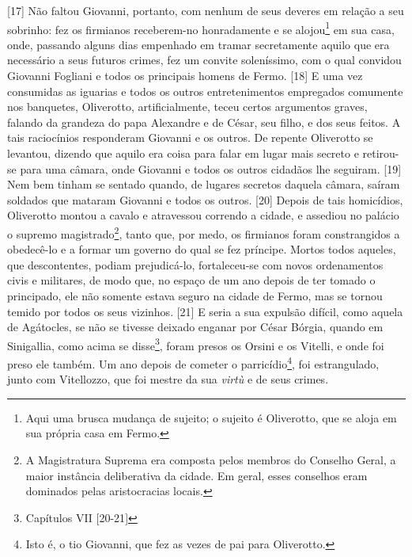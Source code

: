 {[}17{]} Não faltou Giovanni, portanto, com nenhum de seus deveres em
relação a seu sobrinho: fez os firmianos receberem-no honradamente e se
alojou\footnote{Aqui uma brusca mudança de sujeito; o sujeito é
  Oliverotto, que se aloja em sua própria casa em Fermo.} em sua casa,
onde, passando alguns dias empenhado em tramar secretamente aquilo que
era necessário a seus futuros crimes, fez um convite soleníssimo, com o
qual convidou Giovanni Fogliani e todos os principais homens de Fermo.
{[}18{]} E uma vez consumidas as iguarias e todos os outros
entretenimentos empregados comumente nos banquetes, Oliverotto,
artificialmente, teceu certos argumentos graves, falando da grandeza do
papa Alexandre e de César, seu filho, e dos seus feitos. A tais
raciocínios responderam Giovanni e os outros. De repente Oliverotto se
levantou, dizendo que aquilo era coisa para falar em lugar mais secreto
e retirou-se para uma câmara, onde Giovanni e todos os outros cidadãos
lhe seguiram. {[}19{]} Nem bem tinham se sentado quando, de lugares
secretos daquela câmara, saíram soldados que mataram Giovanni e todos os
outros. {[}20{]} Depois de tais homicídios, Oliverotto montou a cavalo e
atravessou correndo a cidade, e assediou no palácio o supremo
magistrado\footnote{A Magistratura Suprema era composta pelos membros do
  Conselho Geral, a maior instância deliberativa da cidade. Em geral,
  esses conselhos eram dominados pelas aristocracias locais.}, tanto
que, por medo, os firmianos foram constrangidos a obedecê-lo e a formar
um governo do qual se fez príncipe. Mortos todos aqueles, que
descontentes, podiam prejudicá-lo, fortaleceu-se com novos ordenamentos
civis e militares, de modo que, no espaço de um ano depois de ter tomado
o principado, ele não somente estava seguro na cidade de Fermo, mas se
tornou temido por todos os seus vizinhos. {[}21{]} E seria a sua
expulsão difícil, como aquela de Agátocles, se não se tivesse deixado
enganar por César Bórgia, quando em Sinigallia, como acima se
disse\footnote{Capítulos VII {[}20-21{]}}, foram presos os Orsini e os
Vitelli, e onde foi preso ele também. Um ano depois de cometer o
parricídio\footnote{Isto é, o tio Giovanni, que fez as vezes de pai para
  Oliverotto.}, foi estrangulado, junto com Vitellozzo, que foi mestre
da sua \emph{virtù} e de seus crimes.

